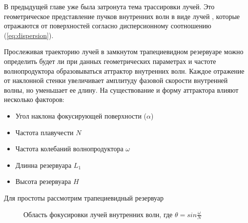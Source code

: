 В предыдущей главе уже была затронута тема трассировки лучей. Это геометрическое представление пучков внутренних волн в виде лучей \cite{Maas1995}, которые отражаются от поверхностей согласно дисперсионному соотношению (\ref{eq:dispersion}).

Прослеживая траекторию лучей в замкнутом трапециевидном резервуаре можно определить будет ли при данных геометрических параметрах и частоте волнопродуктора образовываться аттрактор внутренних волн. Каждое отражение от наклонной стенки увеличивает амплитуду фазовой скорости внутренней волны, но уменьшает ее длину. На существование и форму аттрактора влияют несколько факторов:

\begin{itemize}
    \item Угол наклона фокусирующей поверхности ($\alpha$)
    \item Частота плавучести $N$
    \item Частота колебаний волнопродуктора $\omega$
    \item Длинна резервуара $L_1$
    \item Высота резервуара $H$
\end{itemize}

Для простоты рассмотрим трапециевидный резервуар 

\begin{figure}[!ht]
    \centering
    \caption{Область фокусировки лучей внутренних волн, где $\theta = sin \frac{\omega}{N}$}
    \label{fig:domainup}
\end{figure}

